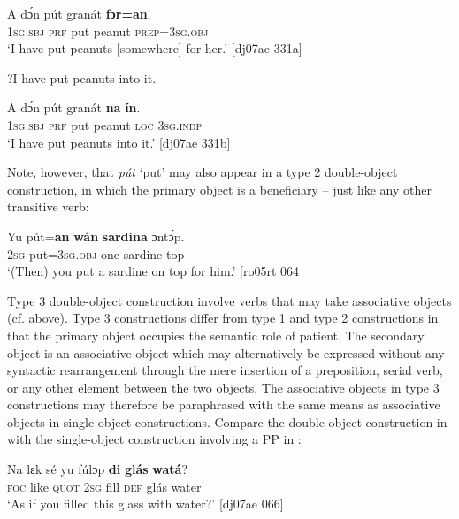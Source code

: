 \ea%
    \label{ex:key:1219}
    \gll A    dɔ́n  pút  granát  \textbf{fɔr=an}.\\
\textsc{1sg.sbj}  \textsc{prf}  put  peanut  \textsc{prep}=\textsc{3sg.obj}\\

\glt ‘I have put peanuts [somewhere] for her.’ [dj07ae 331a]


\glt ?I have put peanuts into it. 
\z


\ea%
    \label{ex:key:1220}
    \gll A    dɔ́n  pút  granát  \textbf{na}  \textbf{ín}.\\
\textsc{1sg.sbj}  \textsc{prf}  put  peanut  \textsc{loc}  \textsc{3sg.indp}\\

\glt ‘I have put peanuts into it.’ [dj07ae 331b]
\z

Note, however, that \textit{pút} ‘put’ may also appear in a type 2 double-object construction, in which the primary object is a beneficiary – just like any other transitive verb:


\ea%
    \label{ex:key:1221}
    \gll Yu  pút=\textbf{an}    \textbf{wán}    \textbf{sardina}  ɔntɔ́p.\\
\textsc{2sg}  put=\textsc{3sg.obj}  one    sardine  top\\

\glt ‘(Then) you put a sardine on top for him.’ [ro05rt 064
\z

Type 3 double-object construction involve verbs that may take associative objects (cf.  above). Type 3 constructions differ from type 1 and type 2 constructions in that the primary object occupies the semantic role of patient. The secondary object is an associative object which may alternatively be expressed without any syntactic rearrangement through the mere insertion of a preposition, serial verb, or any other element between the two objects. The associative objects in type 3 constructions may therefore be paraphrased with the same means as associative objects in single-object constructions. Compare the double-object construction in  with the single-object construction involving a PP in :


\ea%
    \label{ex:key:1222}
    \gll Na  lɛk  sé    yu  fúlɔp  \textbf{di}  \textbf{glás}  \textbf{watá}?\\
\textsc{foc}  like  \textsc{quot}    \textsc{2sg}  fill    \textsc{def}  glás  water\\

\glt ‘As if you filled this glass with water?’ [dj07ae 066]
\z


